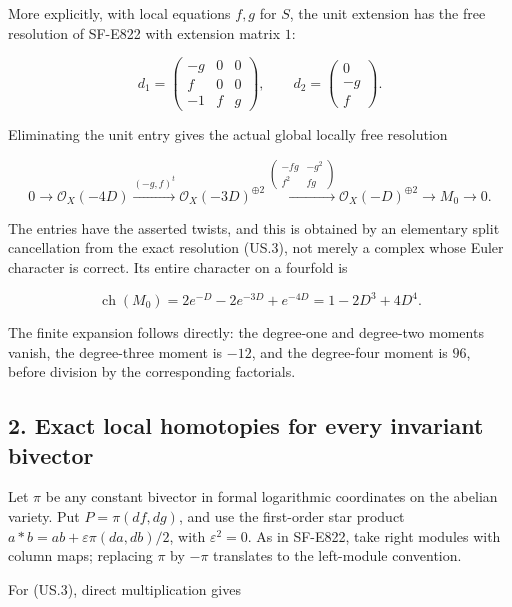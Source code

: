More explicitly, with local equations \(f,g\) for \(S\), the unit
extension has the free resolution of SF-E822 with extension matrix
\(1\):

\[
 d_1=\begin{pmatrix}-g&0&0\\f&0&0\\-1&f&g\end{pmatrix},
 \qquad d_2=\begin{pmatrix}0\\-g\\f\end{pmatrix}.
 \tag{US.3}
\]

Eliminating the unit entry gives the actual global locally free
resolution

\[
 0\longrightarrow\mathcal O_X(-4D)
 \xrightarrow{(-g,f)^t}\mathcal O_X(-3D)^{\oplus2}
 \xrightarrow{\left(\begin{smallmatrix}-fg&-g^2\\f^2&fg\end{smallmatrix}\right)}
 \mathcal O_X(-D)^{\oplus2}\longrightarrow M_0\longrightarrow0.
 \tag{US.4}
\]

The entries have the asserted twists, and this is obtained by an
elementary split cancellation from the exact resolution (US.3), not
merely a complex whose Euler character is correct. Its entire character
on a fourfold is

\[
 \operatorname{ch}(M_0)=2e^{-D}-2e^{-3D}+e^{-4D}
       =1-2D^3+4D^4.
 \tag{US.5}
\]

The finite expansion follows directly: the degree-one and degree-two
moments vanish, the degree-three moment is \(-12\), and the degree-four
moment is \(96\), before division by the corresponding factorials.

\subsection{2. Exact local homotopies for every invariant
bivector}\label{SF-US-exact-local-homotopies-for-every-invariant-bivector}

Let \(\pi\) be any constant bivector in formal logarithmic coordinates
on the abelian variety. Put \(P=\pi(df,dg)\), and use the first-order
star product \(a*b=ab+\varepsilon\pi(da,db)/2\), with
\(\varepsilon^2=0\). As in SF-E822, take right modules with column maps;
replacing \(\pi\) by \(-\pi\) translates to the left-module convention.

For (US.3), direct multiplication gives

